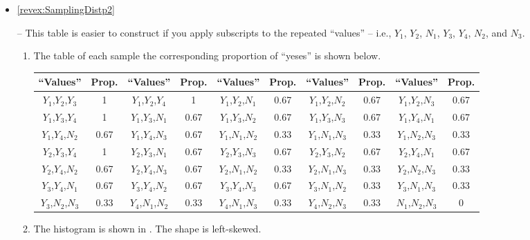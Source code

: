 \documentclass[10pt,openany]{book}\usepackage[]{graphicx}\usepackage[]{color}
\newenvironment{knitrout}{}{} %
\begin{document}
\begin{itemize}
  \item \hypertarget{ans:SamplingDistp2}{\ref{revex:SamplingDistp2}} -- This table is easier to construct if you apply subscripts to the repeated ``values'' -- i.e., $Y_{1}$, $Y_{2}$, $N_{1}$, $Y_{3}$, $Y_{4}$, $N_{2}$, and $N_{3}$.
    \begin{enumerate}
      \item The table of each sample the corresponding proportion of ``yeses'' is shown below.
      \begin{center}
        \begin{tabular}{cc||cc||cc||cc||cc}
\hline\hline
``Values'' & Prop. & ``Values'' & Prop. & ``Values'' & Prop. & ``Values'' & Prop. & ``Values'' & Prop. \\
\hline
$Y_{1}$,$Y_{2}$,$Y_{3}$ & 1    & $Y_{1}$,$Y_{2}$,$Y_{4}$& 1    & $Y_{1}$,$Y_{2}$,$N_{1}$ & 0.67 & $Y_{1}$,$Y_{2}$,$N_{2}$ & 0.67 & $Y_{1}$,$Y_{2}$,$N_{3}$ & 0.67 \\
$Y_{1}$,$Y_{3}$,$Y_{4}$ & 1    & $Y_{1}$,$Y_{3}$,$N_{1}$ & 0.67 & $Y_{1}$,$Y_{3}$,$N_{2}$ & 0.67 & $Y_{1}$,$Y_{3}$,$N_{3}$ & 0.67 & $Y_{1}$,$Y_{4}$,$N_{1}$ & 0.67 \\
$Y_{1}$,$Y_{4}$,$N_{2}$ & 0.67 & $Y_{1}$,$Y_{4}$,$N_{3}$& 0.67 & $Y_{1}$,$N_{1}$,$N_{2}$ & 0.33 & $Y_{1}$,$N_{1}$,$N_{3}$ & 0.33 & $Y_{1}$,$N_{2}$,$N_{3}$ & 0.33 \\
$Y_{2}$,$Y_{3}$,$Y_{4}$ & 1    & $Y_{2}$,$Y_{3}$,$N_{1}$ & 0.67 & $Y_{2}$,$Y_{3}$,$N_{3}$ & 0.67 & $Y_{2}$,$Y_{3}$,$N_{2}$ & 0.67 & $Y_{2}$,$Y_{4}$,$N_{1}$ & 0.67 \\
$Y_{2}$,$Y_{4}$,$N_{2}$ & 0.67 & $Y_{2}$,$Y_{4}$,$N_{3}$ & 0.67 & $Y_{2}$,$N_{1}$,$N_{2}$ & 0.33 & $Y_{2}$,$N_{1}$,$N_{3}$ & 0.33 & $Y_{2}$,$N_{2}$,$N_{3}$ & 0.33\\
$Y_{3}$,$Y_{4}$,$N_{1}$ & 0.67 & $Y_{3}$,$Y_{4}$,$N_{2}$ & 0.67 & $Y_{3}$,$Y_{4}$,$N_{3}$ & 0.67& $Y_{3}$,$N_{1}$,$N_{2}$ & 0.33 & $Y_{3}$,$N_{1}$,$N_{3}$ & 0.33 \\
$Y_{3}$,$N_{2}$,$N_{3}$ & 0.33 & $Y_{4}$,$N_{1}$,$N_{2}$ & 0.33 & $Y_{4}$,$N_{1}$,$N_{3}$ & 0.33 & $Y_{4}$,$N_{2}$,$N_{3}$ & 0.33 & $N_{1}$,$N_{2}$,$N_{3}$ & 0  \\
\hline\hline
         \end{tabular}
      \end{center}

      \item The histogram is shown in .  The shape is left-skewed.
\begin{knitrout}
\color{fgcolor}\begin{figure}[hbtp]


\end{figure}
\end{knitrout}
\end{enumerate}
\end{itemize}
\end{document}
